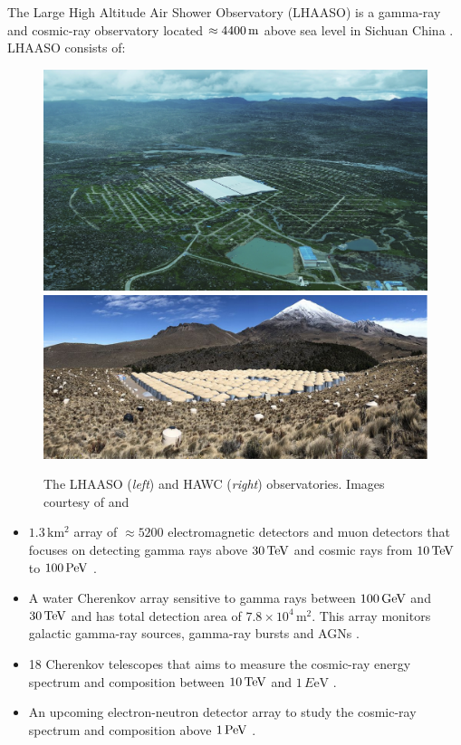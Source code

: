 The Large High Altitude Air Shower Observatory (LHAASO) is a gamma-ray and cosmic-ray observatory located $\approx 4400\,\si{\meter}$ above sea level in Sichuan China \citep{2022ChPhC..46c0001M}. LHAASO consists of:
\begin{figure}[h!]
    \centering
    \includegraphics[height=0.15\textheight]{05_Astronomy/Images/telescopes/LHAASO.jpg}
    \includegraphics[height=0.15\textheight]{05_Astronomy/Images/telescopes/HAWC.png}
    \caption{The LHAASO (\textit{left}) and HAWC (\textit{right}) observatories. Images courtesy of \cite{2022ChPhC..46c0001M} and \cite{2023NIMPA105268253A}}
    \label{fig:my_label}
\end{figure}
\begin{itemize}
    \itemsep0em
    \item $1.3\,\si{\kilo\meter\squared}$ array of $\approx 5200$ electromagnetic detectors and muon detectors that focuses on detecting gamma rays above $30\,\TeV$ and cosmic rays from $10\,\TeV$ to $100\,\PeV$ \citep{2021ChPhC..45b5002A}.
    \item A water Cherenkov array sensitive to gamma rays between $100\,\si{\giga\electronvolt}$ and $30\,\TeV$ and has total detection area of $7.8\times 10^4\,\si{\meter\squared}$. This array monitors galactic gamma-ray sources, gamma-ray bursts and AGNs \citep{2021arXiv210103508L}.
    \item 18 Cherenkov telescopes that aims to measure the cosmic-ray energy spectrum and composition between $10\,\TeV$ and $1\,\si{E\electronvolt}$ \citep{2021EPJC...81..657A}.
    \item An upcoming electron-neutron detector array to study the cosmic-ray spectrum and composition above $1\,\PeV$ \citep{2022ChPhC..46c0001M}.
\end{itemize}
